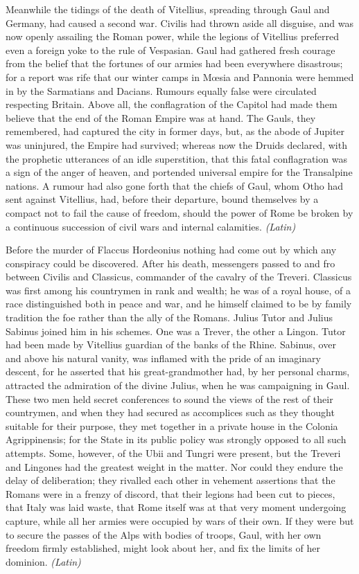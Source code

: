 Meanwhile the tidings of the death of Vitellius, spreading through Gaul and Germany, had caused a second war. Civilis had thrown aside all disguise, and was now openly assailing the Roman power, while the legions of Vitellius preferred even a foreign yoke to the rule of Vespasian. Gaul had gathered fresh courage from the belief that the fortunes of our armies had been everywhere disastrous; for a report was rife that our winter camps in Mœsia and Pannonia were hemmed in by the Sarmatians and Dacians. Rumours equally false were circulated respecting Britain. Above all, the conflagration of the Capitol had made them believe that the end of the Roman Empire was at hand. The Gauls, they remembered, had captured the city in former days, but, as the abode of Jupiter was uninjured, the Empire had survived; whereas now the Druids declared, with the prophetic utterances of an idle superstition, that this fatal conflagration was a sign of the anger of heaven, and portended universal empire for the Transalpine nations. A rumour had also gone forth that the chiefs of Gaul, whom Otho had sent against Vitellius, had, before their departure, bound themselves by a compact not to fail the cause of freedom, should the power of Rome be broken by a continuous succession of civil wars and internal calamities. \emph{(Latin)}


Before the murder of Flaccus Hordeonius nothing had come out by which any conspiracy could be discovered. After his death, messengers passed to and fro between Civilis and Classicus, commander of the cavalry of the Treveri. Classicus was first among his countrymen in rank and wealth; he was of a royal house, of a race distinguished both in peace and war, and he himself claimed to be by family tradition the foe rather than the ally of the Romans. Julius Tutor and Julius Sabinus joined him in his schemes. One was a Trever, the other a Lingon. Tutor had been made by Vitellius guardian of the banks of the Rhine. Sabinus, over and above his natural vanity, was inflamed with the pride of an imaginary descent, for he asserted that his great-grandmother had, by her personal charms, attracted the admiration of the divine Julius, when he was campaigning in Gaul. These two men held secret conferences to sound the views of the rest of their countrymen, and when they had secured as accomplices such as they thought suitable for their purpose, they met together in a private house in the Colonia Agrippinensis; for the State in its public policy was strongly opposed to all such attempts. Some, however, of the Ubii and Tungri were present, but the Treveri and Lingones had the greatest weight in the matter. Nor could they endure the delay of deliberation; they rivalled each other in vehement assertions that the Romans were in a frenzy of discord, that their legions had been cut to pieces, that Italy was laid waste, that Rome itself was at that very moment undergoing capture, while all her armies were occupied by wars of their own. If they were but to secure the passes of the Alps with bodies of troops, Gaul, with her own freedom firmly established, might look about her, and fix the limits of her dominion. \emph{(Latin)}

